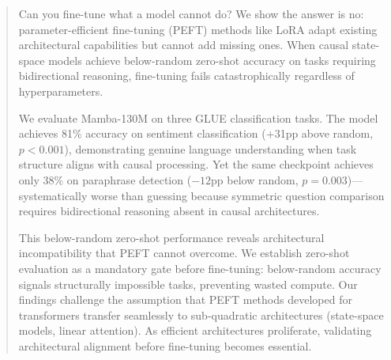\begin{abstract}
Can you fine-tune what a model cannot do? We show the answer is no: parameter-efficient fine-tuning (PEFT) methods like LoRA adapt existing architectural capabilities but cannot add missing ones. When causal state-space models achieve below-random zero-shot accuracy on tasks requiring bidirectional reasoning, fine-tuning fails catastrophically regardless of hyperparameters.

We evaluate Mamba-130M on three GLUE classification tasks. The model achieves 81\% accuracy on sentiment classification (+31pp above random, $p<0.001$), demonstrating genuine language understanding when task structure aligns with causal processing. Yet the same checkpoint achieves only 38\% on paraphrase detection ($-12$pp below random, $p=0.003$)---systematically worse than guessing because symmetric question comparison requires bidirectional reasoning absent in causal architectures.

This below-random zero-shot performance reveals architectural incompatibility that PEFT cannot overcome. We establish zero-shot evaluation as a mandatory gate before fine-tuning: below-random accuracy signals structurally impossible tasks, preventing wasted compute. Our findings challenge the assumption that PEFT methods developed for transformers transfer seamlessly to sub-quadratic architectures (state-space models, linear attention). As efficient architectures proliferate, validating architectural alignment before fine-tuning becomes essential.
\end{abstract}
